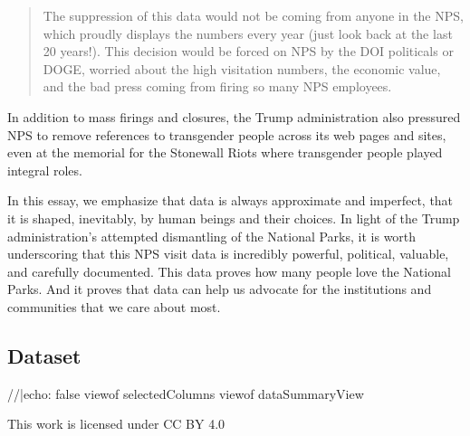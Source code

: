 \documentclass[
  letterpaper,
  DIV=11,
  numbers=noendperiod]{scrartcl}
\newenvironment{Shaded}{\begin{snugshade}}{\end{snugshade}}
\newcommand{\NormalTok}[1]{\textcolor[rgb]{0.00,0.23,0.31}{#1}}
\begin{document}
\begin{quote}
The suppression of this data would not be coming from anyone in the NPS,
which proudly displays the numbers every year (just look back at the
last 20 years!). This decision would be forced on NPS by the DOI
politicals or DOGE, worried about the high visitation numbers, the
economic value, and the bad press coming from firing so many NPS
employees.
\end{quote}

In addition to mass firings and closures, the Trump administration also
pressured NPS to remove references to transgender people across its web
pages and sites, even at the memorial for the Stonewall Riots where
transgender people played integral roles.~

In this essay, we emphasize that data is always approximate and
imperfect, that it is shaped, inevitably, by human beings and their
choices. In light of the Trump administration's attempted dismantling of
the National Parks, it is worth underscoring that this NPS visit data is
incredibly powerful, political, valuable, and carefully documented. This
data proves how many people love the National Parks. And it proves that
data can help us advocate for the institutions and communities that we
care about most.

\subsection{Dataset}\label{dataset}

\begin{tcolorbox}[enhanced jigsaw, opacityback=0, toptitle=1mm, colframe=quarto-callout-note-color-frame, breakable, toprule=.15mm, rightrule=.15mm, left=2mm, colbacktitle=quarto-callout-note-color!10!white, bottomrule=.15mm, arc=.35mm, bottomtitle=1mm, titlerule=0mm, title={View Summary of Columns}, leftrule=.75mm, coltitle=black, opacitybacktitle=0.6, colback=white]

\begin{Shaded}
\begin{Highlighting}[]
\NormalTok{//|echo: false}
\NormalTok{viewof selectedColumns}
\NormalTok{viewof dataSummaryView}
\end{Highlighting}
\end{Shaded}

\end{tcolorbox}

\begin{tcolorbox}[enhanced jigsaw, opacityback=0, toptitle=1mm, colframe=quarto-callout-tip-color-frame, breakable, toprule=.15mm, rightrule=.15mm, left=2mm, colbacktitle=quarto-callout-tip-color!10!white, bottomrule=.15mm, arc=.35mm, bottomtitle=1mm, titlerule=0mm, title={Creative Commons License}, leftrule=.75mm, coltitle=black, opacitybacktitle=0.6, colback=white]

This work is licensed under CC BY 4.0

\end{tcolorbox}
\end{document}
